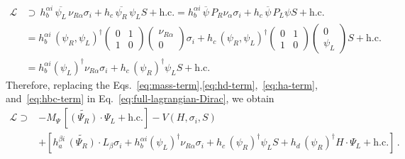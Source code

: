 \documentclass[12pt,letterpaper]{article}
\begin{document}
\begin{align}
\label{eq:hbc-term}
\mathcal{L}  & \supset\, 
 h_b^{\alpha i}\, \overline{\psi_L}\,\nu_{R\alpha} \sigma_i +
 h_c\,\overline{\psi_R}\,\psi_L S  + \text{h.c.}
 = h_b^{\alpha i}\, \overline{\psi}\,P_R \nu_{\alpha} \sigma_i +
 h_c\,\overline{\psi}\,P_L\psi S  + \text{h.c.} \nonumber\\
 & = h_b^{\alpha i}\,(\psi_R , \psi_L)^{\dagger}\begin{pmatrix}
 0&1\\
 1&0
 \end{pmatrix}\begin{pmatrix}
 \nu_{R\alpha} \\ 0
 \end{pmatrix}\sigma_i
 + h_c\,(\psi_R , \psi_L)^{\dagger}\begin{pmatrix}
 0&1\\
 1&0
 \end{pmatrix}\begin{pmatrix}
 0 \\ \psi_L
 \end{pmatrix}S + \text{h.c.} \nonumber \\
 & = h_b^{\alpha i} ({\psi}_{L})^\dagger \nu_{R\alpha} \sigma_i
+ h_c\, ({\psi}_{R})^\dagger\psi_{L} S + \text{h.c.}
\end{align}
Therefore, replacing the Eqs.~\eqref{eq:mass-term},\eqref{eq:hd-term},~\eqref{eq:ha-term}, and~\eqref{eq:hbc-term} in Eq.~\eqref{eq:full-lagrangian-Dirac}, we obtain
\begin{align}
\mathcal{L} \supset &
-M_{\Psi}\, \left[\widetilde{(\Psi_R)} \cdot \Psi_L +\text{h.c.}\right]  -V(H,\sigma_i, S)\nonumber  \\
&+  \left[ h_a^{\beta i}\,\widetilde{(\Psi_R)}\cdot L_\beta \sigma_i
+ h_b^{\alpha i} ({\psi}_{L})^\dagger \nu_{R\alpha} \sigma_i
+ h_c\, ({\psi}_{R})^\dagger\psi_{L} S 
+ h_d\, (\psi_R )^\dagger H\cdot\Psi_L 
+ \text{h.c.}\right] \,.
\end{align}




\end{document}

